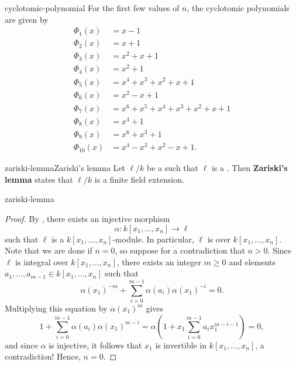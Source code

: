 \begin{example}{cyclotomic-polynomial}
    For the first few values of $n$, the cyclotomic polynomials are given by
    \[ \begin{aligned}
        \Phi_1(x) &= x - 1 \\
        \Phi_2(x) &= x + 1 \\
        \Phi_3(x) &= x^2 + x + 1 \\
        \Phi_4(x) &= x^2 + 1 \\
        \Phi_5(x) &= x^4 + x^3 + x^2 + x + 1 \\
        \Phi_6(x) &= x^2 - x + 1 \\
        \Phi_7(x) &= x^6 + x^5 + x^4 + x^3 + x^2 + x + 1 \\
        \Phi_8(x) &= x^4 + 1 \\
        \Phi_9(x) &= x^6 + x^3 + 1 \\
        \Phi_{10}(x) &= x^4 - x^3 + x^2 - x + 1 .
    \end{aligned} \]
\end{example}

\begin{topic}{zariski-lemma}{Zariski's lemma}
    Let $\ell/k$ be a  such that $\ell$ is a . Then \textbf{Zariski's lemma} states that $\ell/k$ is a finite field extension.
\end{topic}

\begin{example}{zariski-lemma}
    \begin{proof}
        By , there exists an injective morphism
        \[ \alpha : k[x_1, \ldots, x_n] \to \ell \]
        such that $\ell$ is a  $k[x_1, \ldots, x_n]$-module. In particular, $\ell$ is  over $k[x_1, \ldots, x_n]$. Note that we are done if $n = 0$, so suppose for a contradiction that $n > 0$.
        Since $\ell$ is integral over $k[x_1, \ldots, x_n]$, there exists an integer $m \ge 0$ and elements $a_1, \ldots, a_{m - 1} \in k[x_1, \ldots, x_n]$ such that
        \[ \alpha(x_1)^{-m} + \sum_{i = 0}^{m - 1} \alpha(a_i) \alpha(x_1)^{-i} = 0 . \]
        Multiplying this equation by $\alpha(x_1)^m$ gives
        \[ 1 + \sum_{i = 0}^{m - 1} \alpha(a_i) \alpha(x_1)^{m - i} = \alpha\left(1 + x_1 \sum_{i = 0}^{m - 1} a_i x_1^{m - i - 1} \right) = 0 , \]
        and since $\alpha$ is injective, it follows that $x_1$ is invertible in $k[x_1, \ldots, x_n]$, a contradiction! Hence, $n = 0$.
    \end{proof}
\end{example}
